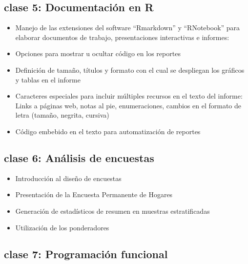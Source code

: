 \documentclass[]{book}
\providecommand{\tightlist}{%
  \setlength{\itemsep}{0pt}\setlength{\parskip}{0pt}}
\begin{document}
\hypertarget{clase-5-documentacion-en-r}{%
\subsection{\texorpdfstring{\textbf{clase 5}: Documentación en R}{clase 5: Documentación en R}}\label{clase-5-documentacion-en-r}}

\begin{itemize}
\tightlist
\item
  Manejo de las extensiones del software ``Rmarkdown'' y ``RNotebook'' para elaborar documentos de trabajo, presentaciones interactivas e informes:
\item
  Opciones para mostrar u ocultar código en los reportes
\item
  Definición de tamaño, títulos y formato con el cual se despliegan los gráficos y tablas en el informe
\item
  Caracteres especiales para incluir múltiples recursos en el texto del informe: Links a páginas web, notas al pie, enumeraciones, cambios en el formato de letra (tamaño, negrita, cursiva)
\item
  Código embebido en el texto para automatización de reportes
\end{itemize}

\hypertarget{clase-6-analisis-de-encuestas}{%
\subsection{\texorpdfstring{\textbf{clase 6}: Análisis de encuestas}{clase 6: Análisis de encuestas}}\label{clase-6-analisis-de-encuestas}}

\begin{itemize}
\tightlist
\item
  Introducción al diseño de encuestas
\item
  Presentación de la Encuesta Permanente de Hogares
\item
  Generación de estadísticos de resumen en muestras estratificadas
\item
  Utilización de los ponderadores
\end{itemize}

\hypertarget{clase-7-programacion-funcional}{%
\subsection{\texorpdfstring{\textbf{clase 7}: Programación funcional}{clase 7: Programación funcional}}\label{clase-7-programacion-funcional}}
\end{document}
